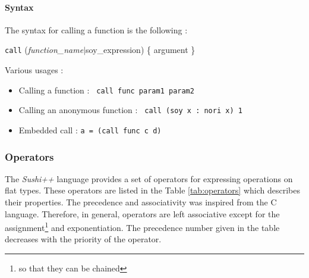 \documentclass[a4paper,11pt]{article}
\begin{document}
\paragraph{Syntax} The syntax for calling a function is the following :
\begin{center}
	\texttt{call} (\textit{function\_name}$|$soy\_expression) \{ argument \}
\end{center}
Various usages :
\begin{itemize}
	\item Calling a function : \texttt{ call func param1 param2 }
	\item Calling an anonymous function : \texttt{ call (soy x : nori x) 1 }
	\item Embedded call : \texttt{a = (call func c d) }
\end{itemize}
\subsubsection{Operators}
The \textit{Sushi++} language provides a set of operators for expressing operations on flat types. These operators are listed in the Table \ref{tab:operators} which describes their properties. The precedence and associativity was inspired from the C language. Therefore, in general, operators are left associative except for the assignment\footnote{so that they can be chained} and exponentiation. The precedence number given in the table decreases with the priority of the operator.
\end{document}
